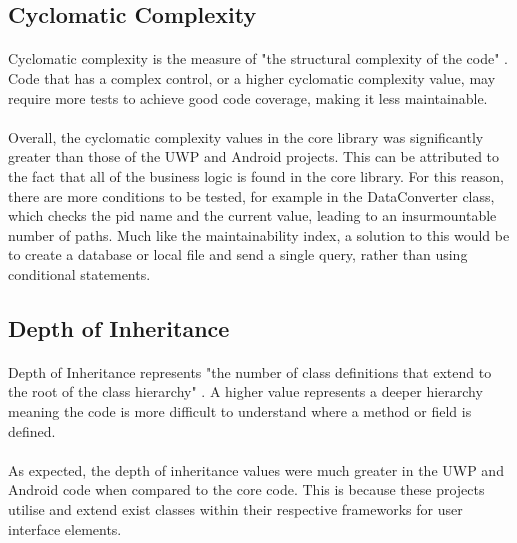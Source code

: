 {	\subsection*{Cyclomatic Complexity}
		\paragraph{}{
		Cyclomatic complexity is the measure of "the structural complexity of the code" \cite{CodeMetrics}. Code that has a complex control, or a higher cyclomatic complexity value, may require more tests to achieve good code coverage, making it less maintainable.
		}
		\paragraph{}{
		Overall, the cyclomatic complexity values in the core library was significantly greater than those of the UWP and Android projects. This can be attributed to the fact that all of the business logic is found in the core library. For this reason, there are more conditions to be tested, for example in the DataConverter class, which checks the pid name and the current value, leading to an insurmountable number of paths. Much like the maintainability index, a solution to this would be to create a database or local file and send a single query, rather than using conditional statements.
		}
	
	\subsection*{Depth of Inheritance}{
		\paragraph{}{
		Depth of Inheritance represents "the number of class definitions that extend to the root of the class hierarchy" \cite{CodeMetrics}. A higher value represents a deeper hierarchy meaning the code is more difficult to understand where a method or field is defined.
		}
		\paragraph{}{
		As expected, the depth of inheritance values were much greater in the UWP and Android code when compared to the core code. This is because these projects utilise and extend exist classes within their respective frameworks for user interface elements.
		}
		

}}
